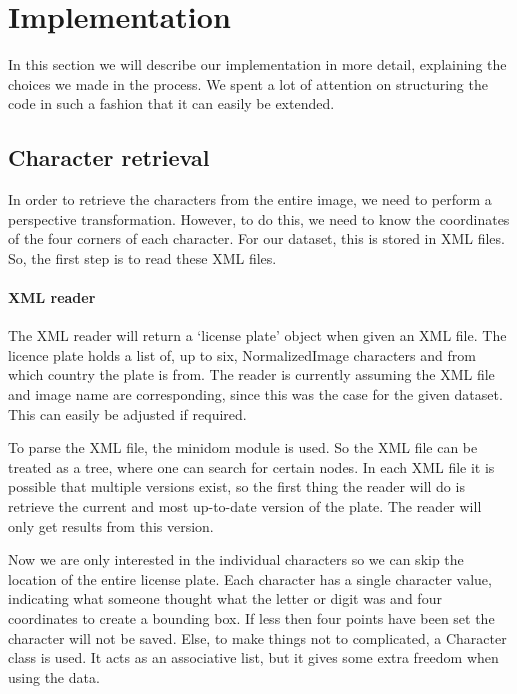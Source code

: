 \documentclass[a4paper]{article}
\begin{document}
\section{Implementation}

In this section we will describe our implementation in more detail, explaining
the choices we made in the process. We spent a lot of attention on structuring
the code in such a fashion that it can easily be extended.

\subsection{Character retrieval}

In order to retrieve the characters from the entire image, we need to
perform a perspective transformation. However, to do this, we need to know the
coordinates of the four corners of each character. For our dataset, this is
stored in XML files. So, the first step is to read these XML files.

\paragraph*{XML reader}

The XML reader will return a `license plate' object when given an XML file. The
licence plate holds a list of, up to six, NormalizedImage characters and from
which country the plate is from. The reader is currently assuming the XML file
and image name are corresponding, since this was the case for the given
dataset. This can easily be adjusted if required.

To parse the XML file, the minidom module is used. So the XML file can be
treated as a tree, where one can search for certain nodes. In each XML
file it is possible that multiple versions exist, so the first thing the reader
will do is retrieve the current and most up-to-date version of the plate. The
reader will only get results from this version.

Now we are only interested in the individual characters so we can skip the
location of the entire license plate. Each character has
a single character value, indicating what someone thought what the letter or
digit was and four coordinates to create a bounding box. If less then four
points have been set the character will not be saved. Else, to make things not
to complicated, a Character class is used. It acts as an associative list, but
it gives some extra freedom when using the data.
\end{document}
